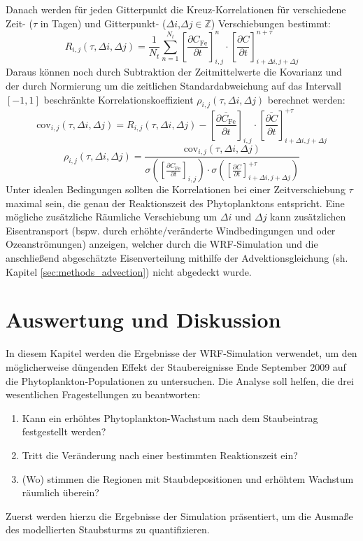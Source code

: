 \documentclass[12pt,a4paper,onecolumn]{scrartcl}
\begin{document}
Danach werden für jeden Gitterpunkt die Kreuz-Korrelationen für verschiedene Zeit- ($\tau$ in Tagen) und Gitterpunkt- ($\Delta i$,$\Delta j \in \mathbb{Z}$) Verschiebungen bestimmt:
\begin{equation}
R_{i,j}(\tau,\Delta i, \Delta j)= \frac{1}{N_t}\sum\limits_{n=1}^{N_t} \left[\frac{\partial C_\text{Fe}}{\partial t}\right]_{i,j}^n \cdot \left[\frac{\partial C}{\partial t}\right]_{i+\Delta i ,j+\Delta j}^{n+\tau}
\end{equation}
Daraus können noch durch Subtraktion der Zeitmittelwerte die Kovarianz und der durch Normierung um die zeitlichen Standardabweichung auf das Intervall $[-1,1]$ beschränkte Korrelationskoeffizient $\rho_{i,j}(\tau,\Delta i, \Delta j)$ berechnet werden:
\begin{equation}
\text{cov}_{i,j}(\tau,\Delta i, \Delta j) = R_{i,j}(\tau,\Delta i, \Delta j)-\left[\frac{\overline{\partial C_\text{Fe}}}{\partial t}\right]_{i,j} \cdot \left[\frac{\overline{\partial C}}{\partial t}\right]_{i+\Delta i,j+\Delta j}^{+\tau}
\end{equation}
\begin{equation}
\rho_{i,j}(\tau,\Delta i, \Delta j) = \frac{\text{cov}_{i,j}(\tau,\Delta i, \Delta j)}{\sigma \left(\left[\frac{\partial C_\text{Fe}}{\partial t}\right]_{i,j}\right) \cdot \sigma\left(\left[\frac{\partial C}{\partial t}\right]_{i+\Delta i ,j+\Delta j}^{+\tau}\right)}
\end{equation}
Unter idealen Bedingungen sollten die Korrelationen bei einer Zeitverschiebung $\tau$ maximal sein, die genau der Reaktionszeit des Phytoplanktons entspricht. Eine mögliche zusätzliche Räumliche Verschiebung um $\Delta i$ und $\Delta j$ kann zusätzlichen Eisentransport (bspw. durch erhöhte/veränderte Windbedingungen und oder Ozeanströmungen) anzeigen, welcher durch die WRF-Simulation und die anschließend abgeschätzte Eisenverteilung mithilfe der Advektionsgleichung (sh. Kapitel \ref{sec:methods_advection}) nicht abgedeckt wurde.  

\section{Auswertung und Diskussion} \label{sec:auswertung}
In diesem Kapitel werden die Ergebnisse der WRF-Simulation verwendet, um den möglicherweise düngenden Effekt der Staubereignisse Ende September 2009 auf die Phytoplankton-Populationen zu untersuchen. Die Analyse soll helfen, die drei wesentlichen Fragestellungen zu beantworten:
\begin{enumerate}
\item Kann ein erhöhtes Phytoplankton-Wachstum nach dem Staubeintrag festgestellt werden?
\item Tritt die Veränderung nach einer bestimmten Reaktionszeit ein?
\item (Wo) stimmen die Regionen mit Staubdepositionen und erhöhtem Wachstum räumlich überein?
\end{enumerate}
Zuerst werden hierzu die Ergebnisse der Simulation präsentiert, um die Ausmaße des modellierten Staubsturms zu quantifizieren. 
\end{document}
